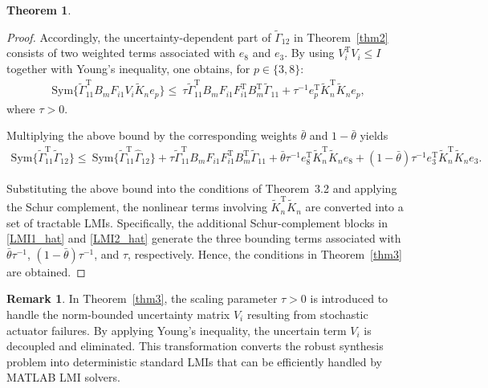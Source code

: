 \documentclass[preprint,review,fleqn,sort&compress,3p]{elsarticle}
\theoremstyle{definition} %
\theoremstyle{definition}%
\newtheorem{thm}{Theorem}[section]
\newtheorem{rem}{Remark}[section]
\begin{document}
\begin{thm}
\begin{proof}
Accordingly, the uncertainty-dependent part of
$\widetilde{\Gamma}_{12}$ in Theorem~\ref{thm2} consists of two weighted terms associated with
$e_8$ and $e_3$. By using $V_i^{\mathrm T}V_i\le I$ together with Young's inequality, one obtains, for $p\in\{3,8\}$:
	\begin{align}
		\mathrm{Sym}
		\{
		\widetilde{\Gamma}_{11}^{\mathrm T}
		B_mF_{i1}V_i
		\widetilde{K}_n e_p
		\}
		\nonumber
		\le\
		\tau
		\widetilde{\Gamma}_{11}^{\mathrm T}
		B_mF_{i1}
		F_{i1}^{\mathrm T}
		B_m^{\mathrm T}
		\widetilde{\Gamma}_{11}
		+
		\tau^{-1}
		e_p^{\mathrm T}
		\widetilde{K}_n^{\mathrm T}
		\widetilde{K}_n
		e_p ,
	\end{align}
	where $\tau>0$.
	
	Multiplying the above bound by the corresponding weights
	$\bar{\theta}$ and $1-\bar{\theta}$ yields
	\begin{align}
		\mathrm{Sym}
		\{
		\widetilde{\Gamma}_{11}^{\mathrm T}
		\widetilde{\Gamma}_{12}
		\}
		\nonumber
		\le\
		\mathrm{Sym}
		\{
		\widetilde{\Gamma}_{11}^{\mathrm T}
		\widehat{\Gamma}_{12}
		\}
		+
		\tau
		\widetilde{\Gamma}_{11}^{\mathrm T}
		B_mF_{i1}
		F_{i1}^{\mathrm T}
		B_m^{\mathrm T}
		\widetilde{\Gamma}_{11}
		+
		\bar{\theta}\tau^{-1}
		e_8^{\mathrm T}
		\widetilde{K}_n^{\mathrm T}
		\widetilde{K}_n
		e_8
		+
		(1-\bar{\theta})\tau^{-1}
		e_3^{\mathrm T}
		\widetilde{K}_n^{\mathrm T}
		\widetilde{K}_n
		e_3 .
	\end{align}
	
	Substituting the above bound into the conditions of Theorem~3.2 and applying the Schur complement, the nonlinear terms involving $\widetilde{K}_n^{\mathrm T}\widetilde{K}_n$ are converted into a set of tractable LMIs.
	Specifically, the additional Schur-complement blocks in
	\eqref{LMI1_hat} and \eqref{LMI2_hat}
	generate the three bounding terms associated with
	$\bar{\theta}\tau^{-1}$, $(1-\bar{\theta})\tau^{-1}$, and $\tau$, respectively.
	Hence, the conditions in Theorem~\ref{thm3} are obtained.
\end{proof}
\begin{rem} \label{rem_robust_parameter}
	In Theorem~\ref{thm3}, the scaling parameter $\tau > 0$ is introduced to handle the norm-bounded uncertainty matrix $V_i$ resulting from stochastic actuator failures. By applying Young's inequality, the uncertain term $V_i$ is decoupled and eliminated. This transformation converts the robust synthesis problem into deterministic standard LMIs that can be efficiently handled by MATLAB LMI solvers.
\end{rem}


\end{thm}
\end{document}
